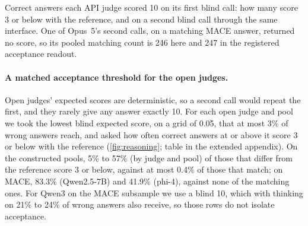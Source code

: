\begin{table}[htbp]
\centering
\caption{Correct answers each API judge scored 10 on its first blind call: how many score 3 or below with the reference, and on a second blind call through the same interface. One of Opus~5's second calls, on a matching \textsc{MACE} answer, returned no score, so its pooled matching count is 246 here and 247 in the registered acceptance readout.\pre}
\label{tab:r20-retest}
\footnotesize
\begin{adjustbox}{max width=\linewidth}\end{adjustbox}
\end{table}

\paragraph{A matched acceptance threshold for the open judges.}
Open judges' expected scores are deterministic, so a second call would repeat the first, and they rarely give any answer exactly 10. For each open judge and pool we took the lowest blind expected score, on a grid of 0.05, that at most 3\% of wrong answers reach, and asked how often correct answers at or above it score 3 or below with the reference (\cref{fig:reasoning}; table in the extended appendix). On the constructed pools, 5\% to 57\% (by judge and pool) of those that differ from the reference score 3 or below, against at most 0.4\% of those that match; on \textsc{MACE}, 83.3\% (Qwen2.5-7B) and 41.9\% (phi-4), against none of the matching ones.\ph{} For Qwen3 on the \textsc{MACE} subsample we use a blind 10, which with thinking on 21\% to 24\% of wrong answers also receive, so those rows do not isolate acceptance.
